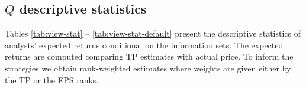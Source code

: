 \documentclass{article}\usepackage[]{graphicx}\usepackage[]{color}
\begin{document}





\subsection{$Q$ descriptive statistics}

Tables \ref{tab:view-stat} -- \ref{tab:view-stat-default} present the descriptive statistics of analysts' expected returns conditional on the information sets. The expected returns  are computed comparing TP estimates with actual price. To inform the strategies we obtain rank-weighted estimates where weights are given either by the TP or the EPS ranks. 
\end{document}

